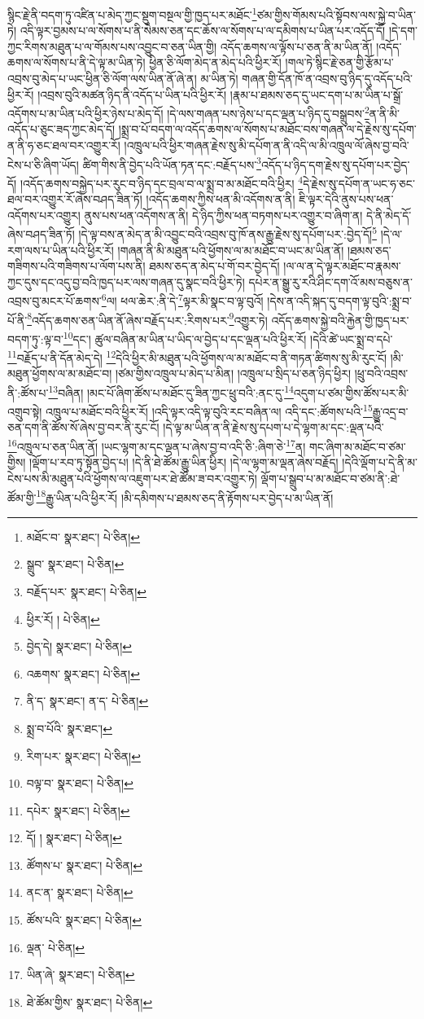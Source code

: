 སྙིང་རྗེ་ནི་བདག་ཏུ་འཛིན་པ་མེད་ཀྱང་སྡུག་བསྔལ་གྱི་ཁྱད་པར་མཐོང་\footnote{མཐོང་བ་  སྣར་ཐང་།  པེ་ཅིན། }ཙམ་གྱིས་གོམས་པའི་སྟོབས་ལས་སྐྱེ་བ་ཡིན་ཏེ། འདི་ལྟར་བྱམས་པ་ལ་སོགས་པ་ནི་སེམས་ཅན་དང་ཆོས་ལ་སོགས་པ་ལ་དམིགས་པ་ཡིན་པར་འདོད་དོ། །དེ་དག་ཀྱང་རིགས་མཐུན་པ་ལ་གོམས་པས་འབྱུང་བ་ཅན་ཡིན་གྱི། འདོད་ཆགས་ལ་ལྟོས་པ་ཅན་ནི་མ་ཡིན་ནོ། །འདོད་ཆགས་ལ་སོགས་པ་ནི་དེ་ལྟ་མ་ཡིན་ཏེ། ཕྱིན་ཅི་ལོག་མེད་ན་མེད་པའི་ཕྱིར་རོ། །གལ་ཏེ་སྙིང་རྗེ་ཅན་གྱི་རྩོམ་པ་འབྲས་བུ་མེད་པ་ཡང་ཕྱིན་ཅི་ལོག་ལས་ཡིན་ནོ་ཞེ་ན། མ་ཡིན་ཏེ། གཞན་གྱི་དོན་ཁོ་ན་འབྲས་བུ་ཉིད་དུ་འདོད་པའི་ཕྱིར་རོ། །འབྲས་བུའི་མཚན་ཉིད་ནི་འདོད་པ་ཡིན་པའི་ཕྱིར་རོ། །རྣམ་པ་ཐམས་ཅད་དུ་ཡང་དག་པ་མ་ཡིན་པ་སྒྲོ་འདོགས་པ་མ་ཡིན་པའི་ཕྱིར་ཉེས་པ་མེད་དོ། །དེ་ལས་གཞན་པས་ཉེས་པ་དང་ལྡན་པ་ཉིད་དུ་བསྒྲུབས་\footnote{སྒྲུབ་  སྣར་ཐང་།  པེ་ཅིན། }ན་ནི་མི་འདོད་པ་ཅུང་ཟད་ཀྱང་མེད་དོ། །སྨྲ་བ་པོ་བདག་ལ་འདོད་ཆགས་ལ་སོགས་པ་མཐོང་བས་གཞན་ལ་དེ་རྗེས་སུ་དཔོག་ན་ནི་ཧ་ཅང་ཐལ་བར་འགྱུར་རོ། །འཁྲུལ་པའི་ཕྱིར་གཞན་རྗེས་སུ་མི་དཔོག་ན་ནི་འདི་ལ་མི་འཁྲུལ་ལོ་ཞེས་བྱ་བའི་ངེས་པ་ཅི་ཞིག་ཡོད། ཚིག་གིས་ནི་བྱེད་པའི་ཡོན་ཏན་དང་:བརྗོད་པས་\footnote{བརྗོད་པར་  སྣར་ཐང་།  པེ་ཅིན། }འདོད་པ་ཉིད་དག་རྗེས་སུ་དཔོག་པར་བྱེད་དོ། །འདོད་ཆགས་བསྐྱེད་པར་རུང་བ་ཉིད་དང་བྲལ་བ་ལ་སྨྲ་བ་མ་མཐོང་བའི་ཕྱིར། \footnote{ཕྱིར་རོ། །   པེ་ཅིན། }དེ་རྗེས་སུ་དཔོག་ན་ཡང་ཧ་ཅང་ཐལ་བར་འགྱུར་རོ་ཞེས་བཤད་ཟིན་ཏོ། །འདོད་ཆགས་ཀྱིས་ཕན་མི་འདོགས་ན་ནི། ཇི་ལྟར་དེའི་ནུས་པས་ཕན་འདོགས་པར་འགྱུར། ནུས་པས་ཕན་འདོགས་ན་ནི། དེ་ཉིད་ཀྱིས་ཕན་བཏགས་པར་འགྱུར་བ་ཞིག་ན། དེ་ནི་མེད་དོ་ཞེས་བཤད་ཟིན་ཏོ། །དེ་ལྟ་བས་ན་མེད་ན་མི་འབྱུང་བའི་འབྲས་བུ་ཁོ་ནས་རྒྱུ་རྗེས་སུ་དཔོག་པར་:བྱེད་དོ།\footnote{བྱེད་དེ།  སྣར་ཐང་།  པེ་ཅིན། } །དེ་ལ་རག་ལས་པ་ཡིན་པའི་ཕྱིར་རོ། །གཞན་ནི་མི་མཐུན་པའི་ཕྱོགས་ལ་མ་མཐོང་བ་ཡང་མ་ཡིན་ནོ། །ཐམས་ཅད་གཟིགས་པའི་གཟིགས་པ་ལོག་པས་ནི། ཐམས་ཅད་ན་མེད་པ་གོ་བར་བྱེད་དོ། །ལ་ལ་ན་དེ་ལྟར་མཐོང་བ་རྣམས་ཀྱང་དུས་དང་འདུ་བྱ་བའི་ཁྱད་པར་ལས་གཞན་དུ་སྣང་བའི་ཕྱིར་ཏེ། དཔེར་ན་སྒྱུ་རུ་རའི་ཤིང་དག་འོ་མས་བཅུས་ན་འབྲས་བུ་མངར་པོ་ཆགས་\footnote{འཆགས་  སྣར་ཐང་།  པེ་ཅིན། }ལ། ཕལ་ཆེར་:ནི་དེ་\footnote{ནི་ད་  སྣར་ཐང་། ན་ད་  པེ་ཅིན། }ལྟར་མི་སྣང་བ་ལྟ་བུའོ། །དེས་ན་འདི་སྐད་དུ་བདག་ལྟ་བུའི་:སྨྲ་བ་པོ་ནི་\footnote{སྨྲ་བ་པོའི་  སྣར་ཐང་། }འདོད་ཆགས་ཅན་ཡིན་ནོ་ཞེས་བརྗོད་པར་:རིགས་པར་\footnote{རིག་པར་  སྣར་ཐང་།  པེ་ཅིན། }འགྱུར་ཏེ། འདོད་ཆགས་སྐྱེ་བའི་རྐྱེན་གྱི་ཁྱད་པར་བདག་ཏུ་:ལྟ་བ་\footnote{བལྟ་བ་  སྣར་ཐང་།  པེ་ཅིན། }དང་། ཚུལ་བཞིན་མ་ཡིན་པ་ཡིད་ལ་བྱེད་པ་དང་ལྡན་པའི་ཕྱིར་རོ། །དེའི་ཚེ་ཡང་སྨྲ་བ་དཔེ་\footnote{དཔེར་  སྣར་ཐང་།  པེ་ཅིན། }བརྗོད་པ་ནི་དོན་མེད་དེ། \footnote{དོ། །   སྣར་ཐང་།  པེ་ཅིན། }དེའི་ཕྱིར་མི་མཐུན་པའི་ཕྱོགས་ལ་མ་མཐོང་བ་ནི་གཏན་ཚིགས་སུ་མི་རུང་ངོ། །མི་མཐུན་ཕྱོགས་ལ་མ་མཐོང་བ། །ཙམ་གྱིས་འཁྲུལ་པ་མེད་པ་མིན། །འཁྲུལ་པ་སྲིད་པ་ཅན་ཉིད་ཕྱིར། །ཕྲུ་བའི་འབྲས་ནི་:ཚོས་པ་\footnote{ཚོགས་པ་  སྣར་ཐང་།  པེ་ཅིན། }བཞིན། །མང་པོ་ཞིག་ཚོས་པ་མཐོང་དུ་ཟིན་ཀྱང་ཕྲུ་བའི་:ནང་དུ་\footnote{ནང་ན་  སྣར་ཐང་།  པེ་ཅིན། }འདུག་པ་ཙམ་གྱིས་ཚོས་པར་མི་འགྲུབ་སྟེ། འཁྲུལ་པ་མཐོང་བའི་ཕྱིར་རོ། །འདི་ལྟར་འདི་ལྟ་བུའི་རང་བཞིན་ལ། འདི་དང་:ཚོགས་པའི་\footnote{ཚོས་པའི་  སྣར་ཐང་།  པེ་ཅིན། }རྒྱུ་འདྲ་བ་ཅན་དག་ནི་ཚོས་སོ་ཞེས་བྱ་བར་ནི་རུང་ངོ། །དེ་ལྟ་མ་ཡིན་ན་ནི་རྗེས་སུ་དཔག་པ་དེ་ལྷག་མ་དང་:ལྡན་པའི་\footnote{ལྡན་  པེ་ཅིན། }འཁྲུལ་པ་ཅན་ཡིན་ནོ། །ཡང་ལྷག་མ་དང་ལྡན་པ་ཞེས་བྱ་བ་འདི་ཅི་:ཞིག་ཅེ་\footnote{ཡིན་ཞེ་  སྣར་ཐང་།  པེ་ཅིན། }ན། གང་ཞིག་མ་མཐོང་བ་ཙམ་གྱིས། །ལྡོག་པ་རབ་ཏུ་སྟོན་བྱེད་པ། །དེ་ནི་ཐེ་ཚོམ་རྒྱུ་ཡིན་ཕྱིར། །དེ་ལ་ལྷག་མ་ལྡན་ཞེས་བརྗོད། །དེའི་ལྡོག་པ་དེ་ནི་མ་ངེས་པས་མི་མཐུན་པའི་ཕྱོགས་ལ་འཇུག་པར་ཐེ་ཚོམ་ཟ་བར་འགྱུར་ཏེ། ལྡོག་པ་སྒྲུབ་པ་མ་མཐོང་བ་ཙམ་ནི་:ཐེ་ཚོམ་གྱི་\footnote{ཐེ་ཚོམ་གྱིས་  སྣར་ཐང་།  པེ་ཅིན། }རྒྱུ་ཡིན་པའི་ཕྱིར་རོ། །མི་དམིགས་པ་ཐམས་ཅད་ནི་རྟོགས་པར་བྱེད་པ་མ་ཡིན་ནོ། 